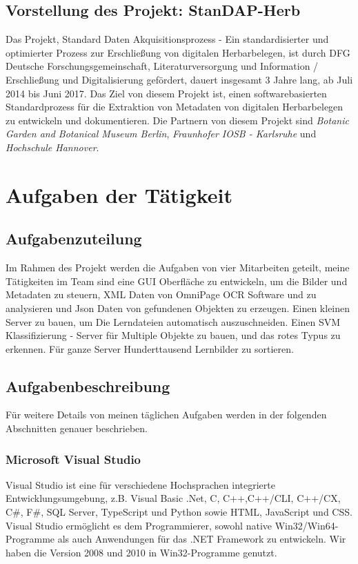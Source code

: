 \documentclass[10pt,a4paper]{report}
\begin{document}
\section{Vorstellung des Projekt: StanDAP-Herb}

Das Projekt, Standard Daten Akquisitionsprozess - Ein standardisierter und optimierter Prozess zur Erschließung von digitalen Herbarbelegen, ist durch DFG Deutsche Forschungsgemeinschaft, Literaturversorgung und Information / Erschließung und Digitalisierung gefördert, dauert insgesamt 3 Jahre lang, ab Juli 2014 bis Juni 2017. Das Ziel von diesem Projekt ist, einen softwarebasierten Standardprozess für die Extraktion von Metadaten von digitalen Herbarbelegen zu entwickeln und dokumentieren. Die Partnern von diesem Projekt sind \textit{Botanic Garden and Botanical Museum Berlin}, \textit{Fraunhofer IOSB - Karlsruhe} und \textit{Hochschule Hannover}.

\chapter{Aufgaben der Tätigkeit}
\section{Aufgabenzuteilung}

Im Rahmen des Projekt werden die Aufgaben von vier Mitarbeiten geteilt, meine Tätigkeiten im Team sind eine GUI Oberfläche zu entwickeln, um die Bilder und Metadaten zu steuern, XML Daten von OmniPage OCR Software und zu analysieren und Json Daten von gefundenen Objekten zu erzeugen. Einen kleinen Server zu bauen, um Die Lerndateien automatisch auszuschneiden. Einen SVM Klassifizierung - Server für Multiple Objekte zu bauen, und das rotes Typus zu erkennen. Für ganze Server Hunderttausend Lernbilder zu sortieren.

\section{Aufgabenbeschreibung}

Für weitere Details von meinen täglichen Aufgaben werden in der folgenden Abschnitten genauer beschrieben. 

\subsection{Microsoft Visual Studio}
Visual Studio ist eine für verschiedene Hochsprachen integrierte Entwicklungsumgebung, z.B. Visual Basic .Net, C, C++,C++/CLI, C++/CX, C\#, F\#, SQL Server, TypeScript und Python sowie HTML, JavaScript und CSS. Visual Studio ermöglicht es dem Programmierer, sowohl native Win32/Win64-Programme als auch Anwendungen für das .NET Framework zu entwickeln\cite{3}. Wir haben die Version 2008 und 2010 in Win32-Programme genutzt.
\end{document}
